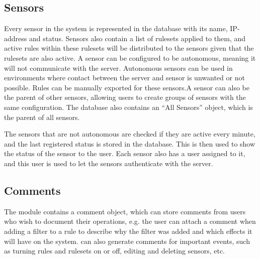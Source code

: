 \subsection{Sensors}
Every sensor in the system is represented in the database with its name,
IP-address and status. Sensors also contain a list of rulesets applied to them,
and active rules within these rulesets will be distributed to the sensors given
that the rulesets are also active. A sensor can be configured to be autonomous,
meaning it will not communicate with the server. Autonomous sensors can be used
in environments where contact between the server and sensor is unwanted or not
possible. Rules can be manually exported for these sensors.A sensor can also be
the parent of other sensors, allowing users to create groups of sensors with the
same configuration. The database also contains an ``All Sensors'' object, which
is the parent of all sensors.

The sensors that are not autonomous are checked if they are active every minute,
and the last registered status is stored in the database. This is then used to show the
status of the sensor to the user. Each sensor also has a user
assigned to it, and this user is used to let the sensors authenticate with the
\snowman{} server.

\subsection{Comments}
The  module contains a comment object, which can store
comments from users who wish to document their operations, e.g. the user can
attach a comment when adding a filter to a rule to describe why the filter was
added and which effects it will have on the system. \snowman{} can also generate
comments for important events, such as turning rules and rulesets on or off,
editing and deleting sensors, etc.
